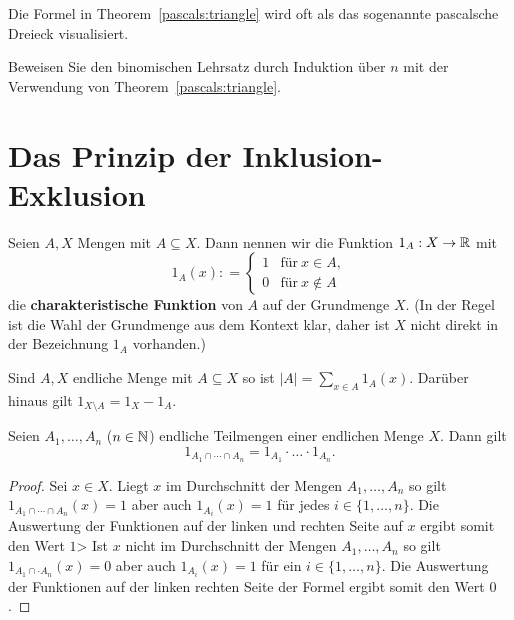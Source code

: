 \begin{bem}
	Die Formel in Theorem~\ref{pascals:triangle} wird oft als das sogenannte pascalsche Dreieck visualisiert. 
\end{bem} 

\begin{aufg}
	Beweisen Sie den binomischen Lehrsatz durch Induktion über $n$ mit der Verwendung von Theorem~\ref{pascals:triangle}. 
\end{aufg} 

\section{Das Prinzip der Inklusion-Exklusion} 

\begin{defn}
	Seien $A,X$ Mengen mit $A \subseteq X$. Dann nennen wir die Funktion $1_A : X \to \mathbb{R}$ mit 
	\[
		1_A(x): = \begin{cases}
				1 &  \text{für} \ x \in A, 
			\\	0 & \text{für} \ x \not\in A
			\end{cases} 
	\]
	die \textbf{charakteristische Funktion} von $A$ auf der Grundmenge $X$. (In der Regel ist die Wahl der Grundmenge aus dem Kontext klar, daher ist $X$ nicht direkt in der Bezeichnung $1_A$ vorhanden.)
\end{defn} 

\begin{bem}
	Sind $A, X$ endliche Menge mit $A \subseteq X$ so ist $|A| = \sum_{x \in A} 1_A(x)$. Darüber hinaus gilt $1_{X \setminus A} = 1_X - 1_A$. 
\end{bem}

\begin{lem}
	Seien $A_1,\ldots,A_n$ ($n \in \mathbb{N}$) endliche Teilmengen einer endlichen Menge $X$. Dann gilt 
	\[
			1_{A_1 \cap \cdots \cap A_n}  = 1_{A_1} \cdot \ldots \cdot 1_{A_n}. 
	\]
\end{lem} 
\begin{proof}
	Sei $x \in X$. 
	Liegt $x$ im Durchschnitt der Mengen $A_1,\ldots,A_n$ so gilt $1_{A_1 \cap \cdots \cap A_n} (x) =1$  aber auch $1_{A_i}(x)=1$ für jedes $i \in \{1,\ldots,n\}$. Die Auswertung der Funktionen auf der linken und rechten Seite auf $x$  ergibt somit den Wert $1$> 
	Ist $x$ nicht im Durchschnitt der Mengen $A_1,\ldots,A_n$ so gilt $1_{A_1 \cap \cdot A_n}(x) =0$ aber auch $1_{A_i}(x)=1$ für ein $i \in \{1,\ldots,n\}$. Die Auswertung der Funktionen auf der linken rechten Seite der Formel ergibt somit den Wert $0$. 
\end{proof} 

